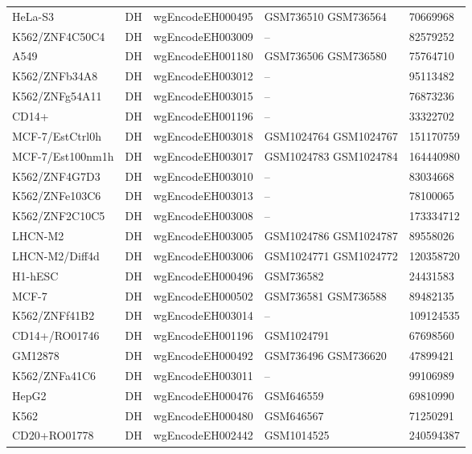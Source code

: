 \begin{longtable}{p{3.5cm}p{1.2cm}p{3.7cm}p{2.5cm}p{2.8cm}}
HeLa-S3 & DH & wgEncodeEH000495 & GSM736510 \newline GSM736564 & 70669968 \\
K562/ZNF4C50C4 & DH & wgEncodeEH003009 & -- & 82579252 \\
A549 & DH & wgEncodeEH001180 & GSM736506 \newline GSM736580 & 75764710 \\
K562/ZNFb34A8 & DH & wgEncodeEH003012 & -- & 95113482 \\
K562/ZNFg54A11 & DH & wgEncodeEH003015 & -- & 76873236 \\
CD14+ & DH & wgEncodeEH001196 & -- & 33322702 \\
MCF-7/EstCtrl0h & DH & wgEncodeEH003018 & GSM1024764 \newline GSM1024767 & 151170759 \\
MCF-7/Est100nm1h & DH & wgEncodeEH003017 & GSM1024783 \newline GSM1024784 & 164440980 \\
K562/ZNF4G7D3 & DH & wgEncodeEH003010 & -- & 83034668 \\
K562/ZNFe103C6 & DH & wgEncodeEH003013 & -- & 78100065 \\
K562/ZNF2C10C5 & DH & wgEncodeEH003008 & -- & 173334712 \\
LHCN-M2 & DH & wgEncodeEH003005 & GSM1024786 \newline GSM1024787 & 89558026 \\
LHCN-M2/Diff4d & DH & wgEncodeEH003006 & GSM1024771 \newline GSM1024772 & 120358720 \\
H1-hESC & DH & wgEncodeEH000496 & GSM736582 & 24431583 \\
MCF-7 & DH & wgEncodeEH000502 & GSM736581 \newline GSM736588 & 89482135 \\
K562/ZNFf41B2 & DH & wgEncodeEH003014 & -- & 109124535 \\
CD14+/RO01746 & DH & wgEncodeEH001196 & GSM1024791 & 67698560 \\
GM12878 & DH & wgEncodeEH000492 & GSM736496 \newline GSM736620 & 47899421 \\
K562/ZNFa41C6 & DH & wgEncodeEH003011 & -- & 99106989 \\
HepG2 & DH & wgEncodeEH000476 & GSM646559 & 69810990 \\
K562 & DH & wgEncodeEH000480 & GSM646567 & 71250291 \\
CD20+RO01778 & DH & wgEncodeEH002442 & GSM1014525 & 240594387 \\

\end{longtable}
